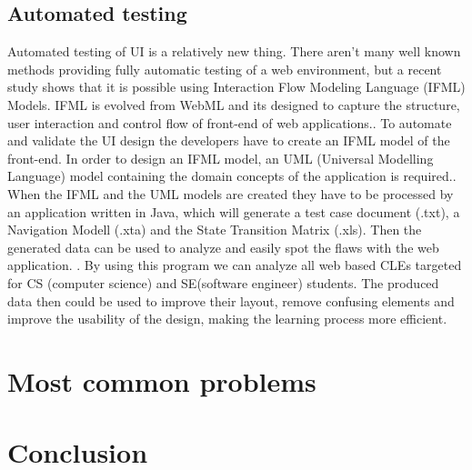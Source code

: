 \documentclass[10pt,twoside,english,a4paper]{article}
\begin{document}
\subsection{Automated testing}
Automated testing of UI is a relatively new thing.\cite{automated_testing_ifml} There aren't many well known methods
providing fully automatic testing of a web environment, but a recent study shows that
it is possible using Interaction Flow Modeling Language (IFML) Models.\cite{automated_testing_ifml}
IFML is evolved from WebML and its designed to capture the structure, user interaction and control
flow of front-end of web applications.\cite{automated_testing_ifml}.
To automate and validate the UI design the developers have to create an IFML model
of the front-end. In order to design an IFML model, an UML (Universal Modelling Language) model 
containing the domain concepts of the application is required.\cite{automated_testing_ifml}. 
When the IFML and the UML models are created they have to be processed by an application written 
in Java, which will generate a test case document (.txt), a Navigation Modell (.xta) and the State Transition 
Matrix (.xls). Then the generated data can be used to analyze and easily spot the flaws with the web application.
\cite{automated_testing_ifml}. 
By using this program we can analyze all web based CLEs targeted for CS (computer science) and SE(software engineer) 
students. The produced data then could be used to improve their layout, remove confusing elements and improve the usability of the design,
making the learning process more efficient.


\section{Most common problems}\label{problems}


\section{Conclusion}






\end{document}
